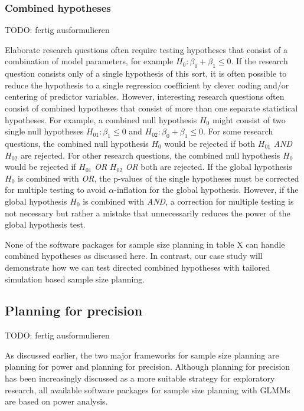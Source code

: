 \documentclass[
  man,floatsintext]{apa6}
\begin{document}
\hypertarget{combined-hypotheses}{%
\subsubsection{Combined hypotheses}\label{combined-hypotheses}}

TODO: fertig ausformulieren

Elaborate research questions often require testing hypotheses that consist of a combination of model parameters, for example \(H_0: \beta_0 + \beta_1 \leq 0\).
If the research question consists only of a single hypothesis of this sort, it is often possible to reduce the hypothesis to a single regression coefficient by clever coding and/or centering of predictor variables.
However, interesting research questions often consist of combined hypotheses that consist of more than one separate statistical hypotheses.
For example, a combined null hypothesis \(H_0\) might consist of two single null hypotheses \(H_{01}: \beta_1 \leq 0\) and \(H_{02}: \beta_0 + \beta_1 \leq 0\).
For some research questions, the combined null hypothesis \(H_0\) would be rejected if both \(H_{01}\) \emph{AND} \(H_{02}\) are rejected.
For other research questions, the combined null hypothesis \(H_0\) would be rejected if \(H_{01}\) \emph{OR} \(H_{02}\) \emph{OR} both are rejected.
If the global hypothesis \(H_0\) is combined with \emph{OR}, the p-values of the single hypotheses must be corrected for multiple testing to avoid \(\alpha\)-inflation for the global hypothesis.
However, if the global hypothesis \(H_0\) is combined with \emph{AND}, a correction for multiple testing is not necessary but rather a mistake that unnecessarily reduces the power of the global hypothesis test.

None of the software packages for sample size planning in table X can handle combined hypotheses as discussed here.
In contrast, our case study will demonstrate how we can test directed combined hypotheses with tailored simulation based sample size planning.

\hypertarget{planning-for-precision-1}{%
\subsection{Planning for precision}\label{planning-for-precision-1}}

TODO: fertig ausformulieren

As discussed earlier, the two major frameworks for sample size planning are planning for power and planning for precision.
Although planning for precision has been increasingly discussed as a more suitable strategy for exploratory research, all available software packages for sample size planning with GLMMs are based on power analysis.
\end{document}
